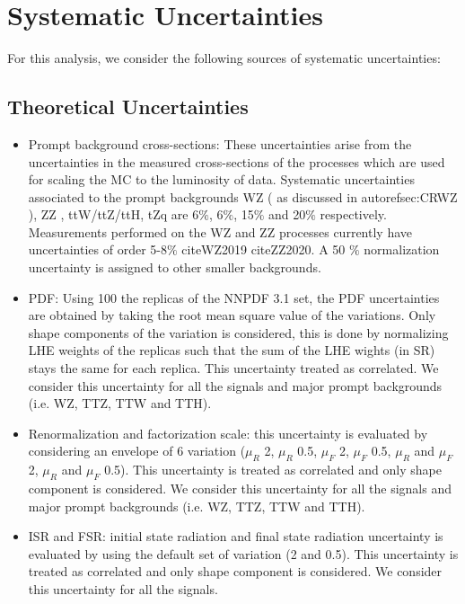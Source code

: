 \chapter{Systematic Uncertainties}
\label{chap:Systematics}

For this analysis, we consider the following sources of systematic uncertainties:
\section{Theoretical Uncertainties}
\label{sec:ThUnc}

\begin{itemize}
\item Prompt background cross-sections: These uncertainties arise from the uncertainties in the measured cross-sections of the processes which are used for scaling the MC to the luminosity of data. Systematic uncertainties associated to the prompt backgrounds WZ ( as discussed in autoref{sec:CRWZ} ), ZZ , ttW/ttZ/ttH, tZq are 6$\%$, 6$\%$, 15$\%$ and 20$\%$ respectively. Measurements performed on the WZ and ZZ processes currently have uncertainties of order 5-8$\%$ cite{WZ2019} cite{ZZ2020}. A 50 $\%$ normalization uncertainty is assigned to other smaller backgrounds.
 \item PDF: Using 100 the replicas of the NNPDF 3.1 set, the PDF uncertainties are obtained by taking the root mean square value of the variations. Only shape components of the variation is considered, this is done by normalizing LHE weights of the replicas such that the sum of the LHE wights (in SR) stays the same for each replica. This uncertainty treated as correlated. We consider this uncertainty for all the signals and major prompt backgrounds (i.e. WZ, TTZ, TTW and TTH).
 \item Renormalization and factorization scale: this uncertainty is evaluated by considering an envelope of 6 variation ($\mu_R$ 2, $\mu_R$ 0.5, $\mu_F$ 2, $\mu_F$ 0.5, $\mu_R$ and $\mu_F$ 2, $\mu_R$ and $\mu_F$ 0.5). This uncertainty is treated as correlated and only shape component is considered. We consider this uncertainty for all the signals and major prompt backgrounds (i.e. WZ, TTZ, TTW and TTH).
 \item ISR and FSR: initial state radiation and final state radiation uncertainty is evaluated by using the default set of variation (2 and 0.5). This uncertainty is treated as correlated and only shape component is considered. We consider this uncertainty for all the signals.
\end{itemize}
